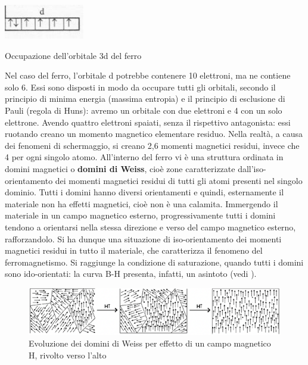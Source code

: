 \begin{marginfigure}[3cm]
\includegraphics{images/img20.png}
\caption{Occupazione dell'orbitale 3d del ferro }
\end{marginfigure}
Nel caso del ferro, l’orbitale d potrebbe contenere 10 elettroni, ma ne contiene solo 6. Essi sono disposti in modo da occupare tutti gli orbitali, secondo il principio di
minima energia (massima entropia) e il principio di esclusione di Pauli (regola di Huns): avremo un orbitale con due elettroni e 4 con un solo elettrone.
Avendo quattro elettroni spaiati, senza il rispettivo antagonista: essi ruotando creano un momento magnetico elementare residuo. Nella
realtà, a causa dei fenomeni di schermaggio, si creano 2,6 momenti magnetici residui, invece che 4 per ogni singolo atomo.
All’interno del ferro vi è una struttura ordinata in domini magnetici o \textbf{domini di Weiss}, cioè zone caratterizzate dall’iso-orientamento dei momenti magnetici residui di tutti gli atomi presenti nel singolo dominio. Tutti i domini hanno diversi orientamenti e quindi, esternamente il materiale non ha effetti magnetici, cioè non è una calamita.
Immergendo il materiale in un campo magnetico esterno, progressivamente tutti i domini tendono a orientarsi nella stessa direzione e verso del campo magnetico esterno, rafforzandolo. Si ha dunque una situazione di iso-orientamento dei momenti magnetici residui in tutto il materiale, che caratterizza il fenomeno del ferromagnetismo.
Si raggiunge la condizione di saturazione, quando tutti i domini sono ido-orientati: la curva B-H presenta, infatti, un asintoto (vedi ).
\begin{figure}[hb]
    \includegraphics[width=1\textwidth]{images/img21.png}
    \caption{Evoluzione dei domini di Weiss per effetto di un campo magnetico H, rivolto verso l'alto}
\end{figure}

